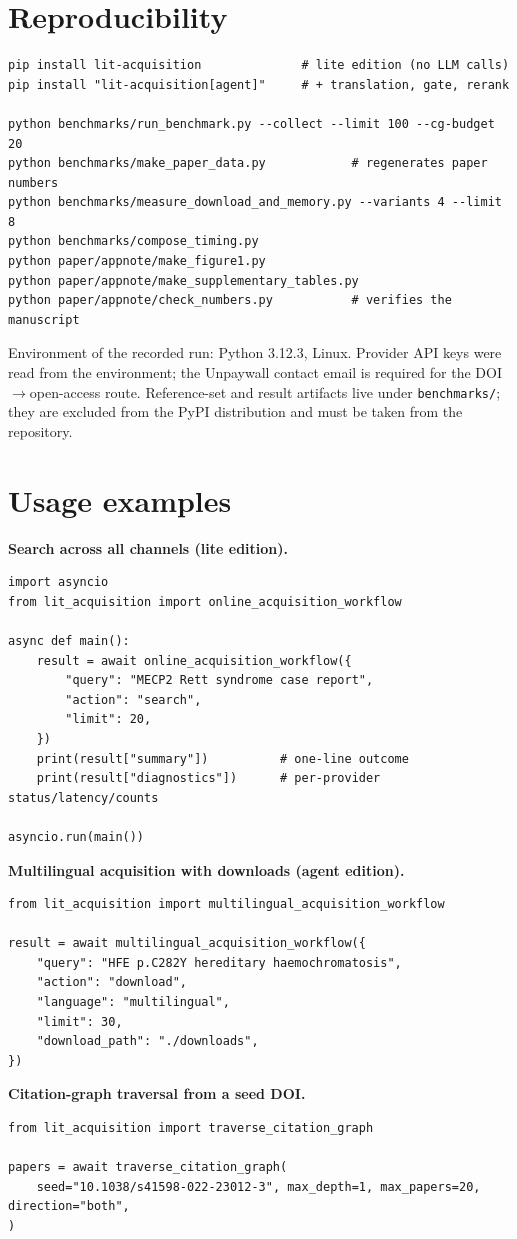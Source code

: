\documentclass[11pt]{article}
\newcommand{\code}[1]{\texttt{#1}}
\begin{document}
\section{Reproducibility}
\begin{lstlisting}
pip install lit-acquisition              # lite edition (no LLM calls)
pip install "lit-acquisition[agent]"     # + translation, gate, rerank

python benchmarks/run_benchmark.py --collect --limit 100 --cg-budget 20
python benchmarks/make_paper_data.py            # regenerates paper numbers
python benchmarks/measure_download_and_memory.py --variants 4 --limit 8
python benchmarks/compose_timing.py
python paper/appnote/make_figure1.py
python paper/appnote/make_supplementary_tables.py
python paper/appnote/check_numbers.py           # verifies the manuscript
\end{lstlisting}
Environment of the recorded run: Python 3.12.3, Linux. Provider API keys were
read from the environment; the Unpaywall contact email is required for the
DOI$\rightarrow$open-access route. Reference-set and result artifacts live under
\code{benchmarks/}; they are excluded from the PyPI distribution and must be
taken from the repository.

\section{Usage examples}
\noindent\textbf{Search across all channels (lite edition).}
\begin{lstlisting}
import asyncio
from lit_acquisition import online_acquisition_workflow

async def main():
    result = await online_acquisition_workflow({
        "query": "MECP2 Rett syndrome case report",
        "action": "search",
        "limit": 20,
    })
    print(result["summary"])          # one-line outcome
    print(result["diagnostics"])      # per-provider status/latency/counts

asyncio.run(main())
\end{lstlisting}

\noindent\textbf{Multilingual acquisition with downloads (agent edition).}
\begin{lstlisting}
from lit_acquisition import multilingual_acquisition_workflow

result = await multilingual_acquisition_workflow({
    "query": "HFE p.C282Y hereditary haemochromatosis",
    "action": "download",
    "language": "multilingual",
    "limit": 30,
    "download_path": "./downloads",
})
\end{lstlisting}

\noindent\textbf{Citation-graph traversal from a seed DOI.}
\begin{lstlisting}
from lit_acquisition import traverse_citation_graph

papers = await traverse_citation_graph(
    seed="10.1038/s41598-022-23012-3", max_depth=1, max_papers=20, direction="both",
)
\end{lstlisting}
\end{document}
